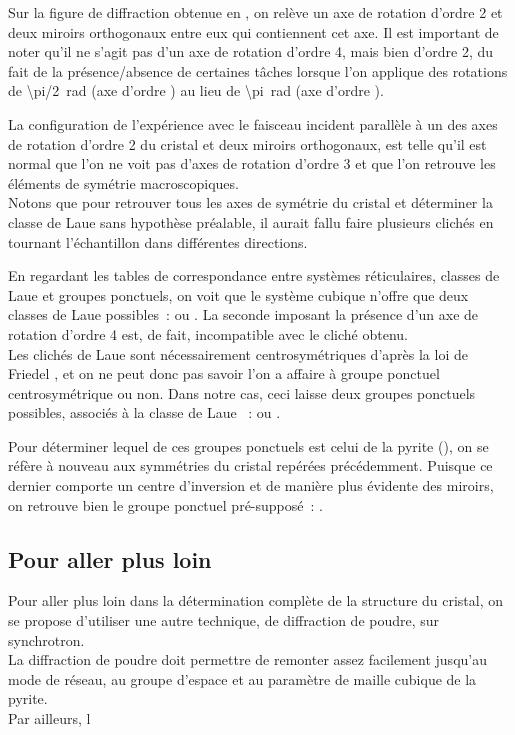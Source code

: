 Sur la figure de diffraction obtenue en , on relève un axe de rotation d'ordre 2 et deux miroirs orthogonaux entre eux qui contiennent cet axe.
Il est important de noter qu'il ne s'agit pas d'un axe de rotation d'ordre 4, mais bien d'ordre 2, du fait de la présence/absence de certaines tâches lorsque l'on applique des rotations de \SI{\pi/2}{\radian} (axe d'ordre ) au lieu de \SI{\pi}{\radian} (axe d'ordre ).

La configuration de l'expérience avec le faisceau incident parallèle à un des axes de rotation d'ordre 2 du cristal et deux miroirs orthogonaux, est telle qu'il est normal que l'on ne voit pas d'axes de rotation d'ordre 3 et que l'on retrouve les éléments de symétrie macroscopiques\cite{JJRousseau2007}.\\
Notons que pour retrouver tous les axes de symétrie du cristal et déterminer la classe de Laue sans hypothèse préalable, il aurait fallu faire plusieurs clichés en tournant l'échantillon dans différentes directions.

En regardant les tables de correspondance entre systèmes réticulaires, classes de Laue et groupes ponctuels\cite{IUCrLaueClass,ShmueliIUCr2016}, on voit que le système cubique n'offre que deux classes de Laue possibles~:  ou .
La seconde imposant la présence d'un axe de rotation d'ordre 4 est, de fait, incompatible avec le cliché obtenu.\\
Les clichés de Laue sont nécessairement centrosymétriques d'après la loi de Friedel , et on ne peut donc pas savoir l'on a affaire à groupe ponctuel centrosymétrique ou non. Dans notre cas, ceci laisse deux groupes ponctuels possibles, associés à la classe de Laue ~:  ou .

Pour déterminer lequel de ces groupes ponctuels est celui de la pyrite (), on se réfère à nouveau aux symmétries du cristal repérées précédemment.
Puisque ce dernier comporte un centre d'inversion et de manière plus évidente des miroirs, on retrouve bien le groupe ponctuel pré-supposé~: .

\subsection{Pour aller plus loin}



Pour aller plus loin dans la détermination complète de la structure du cristal, on se propose d'utiliser une autre technique, de diffraction de poudre, sur synchrotron.\\
La diffraction de poudre doit permettre de remonter assez facilement jusqu'au mode de réseau, au groupe d'espace et au paramètre de maille cubique de la pyrite.\\
Par ailleurs, l

